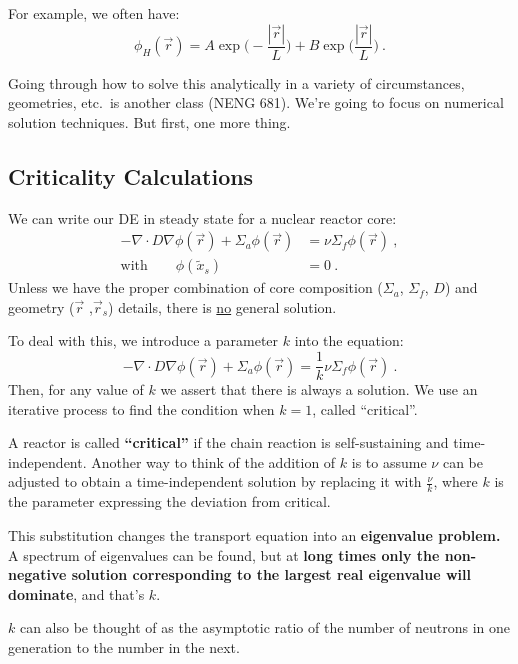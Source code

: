 \documentclass[12pt]{article}
\begin{document}
For example, we often have:
\[\phi_H(\vec{r}) = A\exp\bigl(-\frac{|\vec{r}|}{L}\bigr) + B\exp\bigl(\frac{|\vec{r}|}{L}\bigr) \:.\]

Going through how to solve this analytically in a variety of circumstances, geometries, etc.\ is another class (NENG 681). We're going to focus on numerical solution techniques. But first, one more thing.

\subsection*{Criticality Calculations}

We can write our DE in steady state for a nuclear reactor core:
%
\begin{align*}
-\nabla \cdot D\nabla \phi(\vec{r}) + 
\Sigma_a \phi(\vec{r}) &= \nu \Sigma_f \phi(\vec{r})\:, \\
\text{with} \qquad \phi(\tilde{x}_s) &= 0\:.
\end{align*}
%
Unless we have the proper combination of core composition ($\Sigma_a$, $\Sigma_f$, $D$) and geometry ($\vec{r}$ ,$\vec{r}_s$) details, there is \underline{no} general solution. 

To deal with this, we introduce a parameter $k$ into the equation:
%
\begin{equation}
-\nabla \cdot D\nabla \phi(\vec{r}) + 
\Sigma_a \phi(\vec{r}) = \frac{1}{k}\nu \Sigma_f \phi(\vec{r})\:. \nonumber
\end{equation}
%
Then, for any value of $k$ we assert that there is always a solution. We use an iterative process to find the condition when $k=1$, called ``critical''.

A reactor is called \textbf{``critical''} if the chain reaction is self-sustaining and time-independent. Another way to think of the addition of $k$ is to assume $\nu$ can be adjusted to obtain a time-independent solution by replacing it with $\frac{\nu}{k}$, where $k$ is the parameter expressing the deviation from critical. 

This substitution changes the transport equation into an \textbf{eigenvalue problem.} A spectrum of eigenvalues can be found, but at \textbf{long times only the non-negative solution corresponding to the largest real eigenvalue will dominate}, and that's $k$. 

$k$ can also be thought of as the asymptotic ratio of the number of neutrons in one generation to the number in the next.
\end{document}
